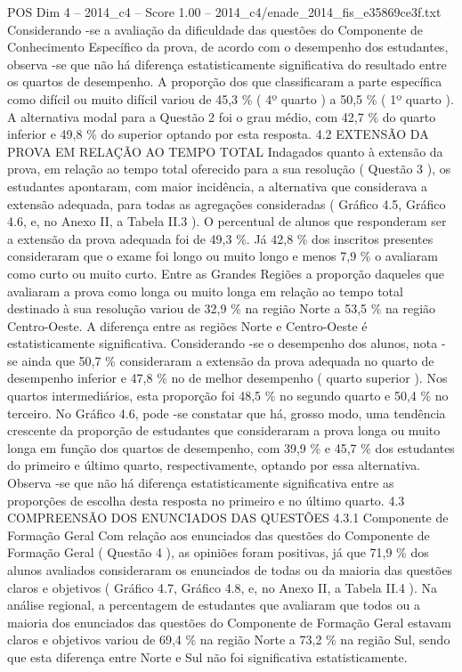 \begin{textsample}{POS Dim 4 – 2014\_c4 – Score 1.00 – 2014\_c4/enade\_2014\_fis\_e35869ce3f.txt}
Considerando -se a avaliação da dificuldade das questões do Componente de Conhecimento Específico da prova, de acordo com o desempenho dos estudantes, observa -se que não há diferença estatisticamente significativa do resultado entre os quartos de desempenho.
A proporção dos que classificaram a parte específica como difícil ou muito difícil variou de 45,3 \% ( 4º quarto ) a 50,5 \% ( 1º quarto ).
A alternativa modal para a Questão 2 foi o grau médio, com 42,7 \% do quarto inferior e 49,8 \% do superior optando por esta resposta. 4.2 EXTENSÃO DA PROVA EM RELAÇÃO AO TEMPO TOTAL Indagados quanto à extensão da prova, em relação ao tempo total oferecido para a sua resolução ( Questão 3 ), os estudantes apontaram, com maior incidência, a alternativa que considerava a extensão adequada, para todas as agregações consideradas ( Gráfico 4.5, Gráfico 4.6, e, no Anexo II, a Tabela II.3 ).
O percentual de alunos que responderam ser a extensão da prova adequada foi de 49,3 \%.
Já 42,8 \% dos inscritos presentes consideraram que o exame foi longo ou muito longo e menos 7,9 \% o avaliaram como curto ou muito curto.
Entre as Grandes Regiões a proporção daqueles que avaliaram a prova como longa ou muito longa em relação ao tempo total destinado à sua resolução variou de 32,9 \% na região Norte a 53,5 \% na região Centro-Oeste.
A diferença entre as regiões Norte e Centro-Oeste é estatisticamente significativa.
Considerando -se o desempenho dos alunos, nota -se ainda que 50,7 \% consideraram a extensão da prova adequada no quarto de desempenho inferior e 47,8 \% no de melhor desempenho ( quarto superior ).
Nos quartos intermediários, esta proporção foi 48,5 \% no segundo quarto e 50,4 \% no terceiro.
No Gráfico 4.6, pode -se constatar que há, grosso modo, uma tendência crescente da proporção de estudantes que consideraram a prova longa ou muito longa em função dos quartos de desempenho, com 39,9 \% e 45,7 \% dos estudantes do primeiro e último quarto, respectivamente, optando por essa alternativa.
Observa -se que não há diferença estatisticamente significativa entre as proporções de escolha desta resposta no primeiro e no último quarto. 4.3 COMPREENSÃO DOS ENUNCIADOS DAS QUESTÕES 4.3.1 Componente de Formação Geral Com relação aos enunciados das questões do Componente de Formação Geral ( Questão 4 ), as opiniões foram positivas, já que 71,9 \% dos alunos avaliados consideraram os enunciados de todas ou da maioria das questões claros e objetivos ( Gráfico 4.7, Gráfico 4.8, e, no Anexo II, a Tabela II.4 ).
Na análise regional, a percentagem de estudantes que avaliaram que todos ou a maioria dos enunciados das questões do Componente de Formação Geral estavam claros e objetivos variou de 69,4 \% na região Norte a 73,2 \% na região Sul, sendo que esta diferença entre Norte e Sul não foi significativa estatisticamente.

\end{textsample}
